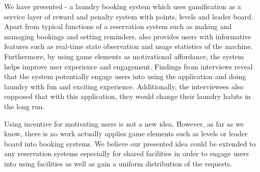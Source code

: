 We have presented {\toolname} - a laundry booking system which uses gamification as a service layer of reward and penalty system with points, levels and leader board. Apart from typical functions of a reservation system such as making and managing bookings and setting reminders, {\toolname} also provides users with informative features such as real-time state observation and usage statistics of the machine. Furthermore, by using game elements as motivational affordance, the system helps improve user experience and engagement. Findings from interviews reveal that the system potentially engage users into using the application and doing laundry with fun and exciting experience. Additionally, the interviewees also supposed that with this application, they would change their laundry habits in the long run.

Using incentive for motivating users is not a new idea. However, as far as we know, there is no work actually applies game elements such as levels or leader board into booking systems. We believe our presented idea could be extended to any reservation systems especially for shared facilities in order to engage users into using facilities as well as gain a uniform distribution of the requests.